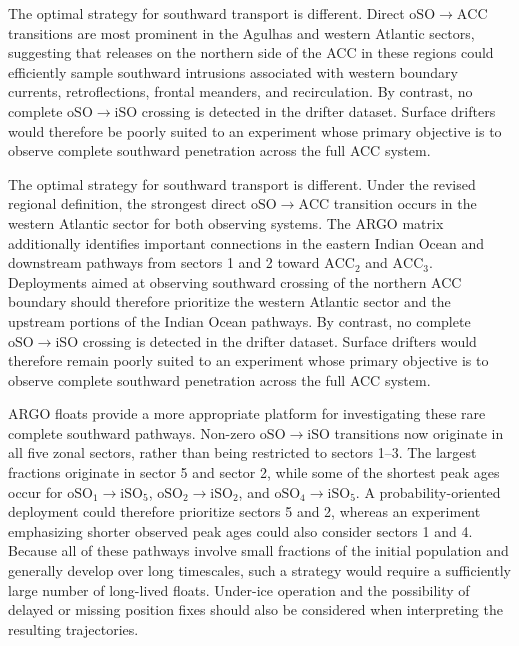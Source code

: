 \documentclass[
  draft
]{agujournal2025}
\begin{document}
        The optimal strategy for southward transport is different. Direct $\mathrm{oSO}\rightarrow\mathrm{ACC}$ transitions are most prominent in the Agulhas and western Atlantic sectors, suggesting that releases on the northern side of the ACC in these regions could efficiently sample southward intrusions associated with western boundary currents,  retroflections, frontal meanders, and recirculation. By contrast, no complete $\mathrm{oSO}\rightarrow\mathrm{iSO}$ crossing is detected in the drifter dataset. Surface drifters would therefore be poorly suited to an experiment whose primary objective is to observe complete southward penetration across the full ACC system.
        
        The optimal strategy for southward transport is different. Under the revised regional definition, the strongest direct $\mathrm{oSO}\rightarrow\mathrm{ACC}$ transition occurs in the western Atlantic sector for both observing systems. The ARGO matrix additionally identifies important connections in the eastern Indian Ocean and downstream pathways from sectors 1 and 2 toward $\mathrm{ACC}_2$ and $\mathrm{ACC}_3$. Deployments aimed at observing southward crossing of the northern ACC boundary should therefore prioritize the western Atlantic sector and the upstream portions of the Indian Ocean pathways. By contrast, no complete $\mathrm{oSO}\rightarrow\mathrm{iSO}$ crossing is detected in the drifter dataset. Surface drifters would therefore remain poorly suited to an experiment whose primary objective is to observe complete southward penetration across the full ACC system.

        ARGO floats provide a more appropriate platform for investigating these rare complete southward pathways. Non-zero $\mathrm{oSO}\rightarrow\mathrm{iSO}$ transitions now originate in all five zonal sectors, rather than being restricted to sectors 1--3. The largest fractions originate in sector 5 and sector 2, while some of the shortest peak ages occur for $\mathrm{oSO}_1 \rightarrow \mathrm{iSO}_5$, $\mathrm{oSO}_2 \rightarrow \mathrm{iSO}_2$, and $\mathrm{oSO}_4 \rightarrow \mathrm{iSO}_5$. A probability-oriented deployment could therefore prioritize sectors 5 and 2, whereas an experiment emphasizing shorter observed peak ages could also consider sectors 1 and 4. Because all of these pathways involve small fractions of the initial population and generally develop over long timescales, such a strategy would require a sufficiently large number of long-lived floats. Under-ice operation and the possibility of delayed or missing position fixes should also be considered when interpreting the resulting trajectories.
        
\end{document}
